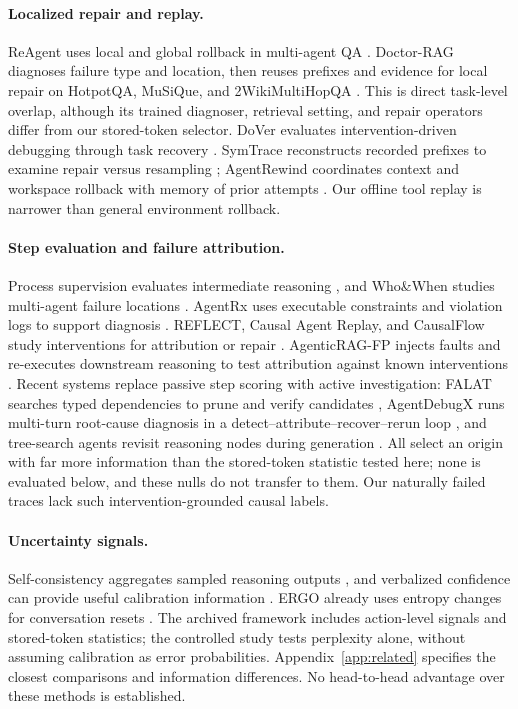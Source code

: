 \documentclass{article}
\begin{document}
\paragraph{Localized repair and replay.}
ReAgent uses local and global rollback in multi-agent QA
\citep{xinjie2025reagent}. Doctor-RAG diagnoses failure type and location,
then reuses prefixes and evidence for local repair on HotpotQA, MuSiQue,
and 2WikiMultiHopQA \citep{jiao2026doctor}. This is direct task-level
overlap, although its trained diagnoser, retrieval setting, and repair
operators differ from our stored-token selector. DoVer evaluates
intervention-driven debugging through task recovery \citep{ma2026dover}.
SymTrace reconstructs recorded prefixes to examine repair versus
resampling \citep{luan2026symtrace}; AgentRewind coordinates context and
workspace rollback with memory of prior attempts \citep{zhuang2026agentrewind}.
Our offline tool replay is narrower than general environment rollback.

\paragraph{Step evaluation and failure attribution.}
Process supervision evaluates intermediate reasoning \citep{lightman2024lets},
and Who\&When studies multi-agent failure locations \citep{zhang2025which}.
AgentRx uses executable constraints and violation logs to support diagnosis
\citep{barke2026agentrx}. REFLECT, Causal Agent Replay, and CausalFlow
study interventions for attribution or repair
\citep{lin2026reflect,shah2026causal,bonagiri2026causalflow}.
AgenticRAG-FP injects faults and re-executes downstream reasoning to test
attribution against known interventions \citep{pothuru2026failures}.
Recent systems replace passive step scoring with active investigation: FALAT
searches typed dependencies to prune and verify candidates
\citep{rafi2026falat}, AgentDebugX runs multi-turn root-cause diagnosis in a
detect--attribute--recover--rerun loop \citep{zhu2026agentdebugx}, and
tree-search agents revisit reasoning nodes during generation
\citep{zhou2024lats}. All select an origin with far more information than the
stored-token statistic tested here; none is evaluated below, and these nulls
do not transfer to them.
Our naturally failed traces lack such intervention-grounded causal labels.

\paragraph{Uncertainty signals.}
Self-consistency aggregates sampled reasoning outputs
\citep{wang2023selfconsistency}, and verbalized confidence can provide
useful calibration information \citep{tian2023just}.
ERGO already uses entropy changes for conversation resets
\citep{khalid2025ergo}. The archived framework includes action-level signals
and stored-token statistics; the controlled study tests perplexity alone,
without assuming calibration as error probabilities.
Appendix~\ref{app:related} specifies the closest comparisons and information
differences. No head-to-head advantage over these methods is established.
\end{document}
